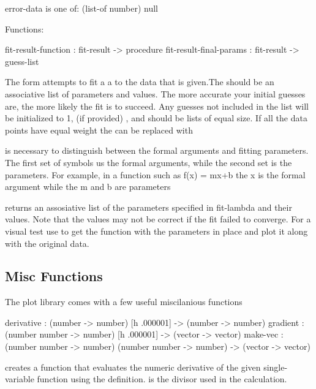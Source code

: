 \documentclass{article}
\begin{document}
{\begin{schemedisplay}
error-data is one of:
  (list-of number)
  null
  
Functions:
  
  fit-result-function : fit-result -> procedure
  fit-result-final-params : fit-result -> guess-list
      
       
\end{schemedisplay}



The  form attempts to fit a a  to the data that is given.The should be an associative list of parameters and values. The more accurate  your initial guesses are, the more likely the fit is to succeed. Any guesses not included in the list will be initialized to 1,  (if provided) ,  and  should be lists of equal size. If all the data points have equal weight
       the  can be replaced with 


 is necessary to distinguish between the formal arguments and fitting parameters. The first set of symbols us the formal arguments, while the second set is the parameters. For example, in a function such as f(x) = mx+b the x is the formal argument while the m and b are parameters


 returns an assosiative list of the parameters specified  in fit-lambda and their values. Note that the values may not be correct if the fit failed to converge. For a visual test use  to get the function with the parameters in place and plot it along with the original data.

\subsection{Misc Functions}


The plot library comes with a few useful miscilanious functions


\begin{schemedisplay}

derivative      : (number -> number) [h .000001] -> (number -> number)   
gradient : (number number -> number) [h .000001] -> (vector -> vector)
make-vec : (number number -> number) (number number -> number) -> (vector -> vector) 
\end{schemedisplay}

 creates a function that evaluates the numeric derivative of the given  single-variable function using the definition.  is the divisor used in the calculation.


}
\end{document}
